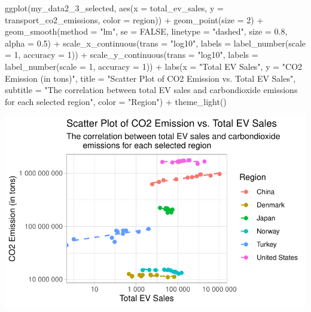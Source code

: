 \documentclass[
  11pt,
  a4paper,
  DIV=11,
  numbers=noendperiod]{scrartcl}
\newenvironment{Shaded}{\begin{snugshade}}{\end{snugshade}}
\newcommand{\AttributeTok}[1]{\textcolor[rgb]{0.40,0.45,0.13}{#1}}
\newcommand{\ConstantTok}[1]{\textcolor[rgb]{0.56,0.35,0.01}{#1}}
\newcommand{\DecValTok}[1]{\textcolor[rgb]{0.68,0.00,0.00}{#1}}
\newcommand{\FloatTok}[1]{\textcolor[rgb]{0.68,0.00,0.00}{#1}}
\newcommand{\FunctionTok}[1]{\textcolor[rgb]{0.28,0.35,0.67}{#1}}
\newcommand{\NormalTok}[1]{\textcolor[rgb]{0.00,0.23,0.31}{#1}}
\newcommand{\SpecialCharTok}[1]{\textcolor[rgb]{0.37,0.37,0.37}{#1}}
\newcommand{\StringTok}[1]{\textcolor[rgb]{0.13,0.47,0.30}{#1}}
\begin{document}
\begin{Shaded}
\begin{Highlighting}[]
\FunctionTok{ggplot}\NormalTok{(my\_data2\_3\_selected, }\FunctionTok{aes}\NormalTok{(}\AttributeTok{x =}\NormalTok{ total\_ev\_sales, }\AttributeTok{y =}\NormalTok{ transport\_co2\_emissions,}
                                \AttributeTok{color =}\NormalTok{ region)) }\SpecialCharTok{+}
  \FunctionTok{geom\_point}\NormalTok{(}\AttributeTok{size =} \DecValTok{2}\NormalTok{) }\SpecialCharTok{+}
  \FunctionTok{geom\_smooth}\NormalTok{(}\AttributeTok{method =} \StringTok{"lm"}\NormalTok{, }\AttributeTok{se =} \ConstantTok{FALSE}\NormalTok{, }\AttributeTok{linetype =} \StringTok{"dashed"}\NormalTok{, }\AttributeTok{size =} \FloatTok{0.8}\NormalTok{,}
              \AttributeTok{alpha =} \FloatTok{0.5}\NormalTok{) }\SpecialCharTok{+}
  \FunctionTok{scale\_x\_continuous}\NormalTok{(}\AttributeTok{trans =} \StringTok{"log10"}\NormalTok{,}
                     \AttributeTok{labels =} \FunctionTok{label\_number}\NormalTok{(}\AttributeTok{scale =} \DecValTok{1}\NormalTok{, }\AttributeTok{accuracy =} \DecValTok{1}\NormalTok{)) }\SpecialCharTok{+}
  \FunctionTok{scale\_y\_continuous}\NormalTok{(}\AttributeTok{trans =} \StringTok{"log10"}\NormalTok{,}
                     \AttributeTok{labels =} \FunctionTok{label\_number}\NormalTok{(}\AttributeTok{scale =} \DecValTok{1}\NormalTok{, }\AttributeTok{accuracy =} \DecValTok{1}\NormalTok{)) }\SpecialCharTok{+}
  \FunctionTok{labs}\NormalTok{(}\AttributeTok{x =} \StringTok{"Total EV Sales"}\NormalTok{,}
       \AttributeTok{y =} \StringTok{"CO2 Emission (in tons)"}\NormalTok{,}
       \AttributeTok{title =} \StringTok{"Scatter Plot of CO2 Emission vs. Total EV Sales"}\NormalTok{,}
       \AttributeTok{subtitle =} \StringTok{"The correlation between total EV sales and carbondioxide}
\StringTok{       emissions for each selected region"}\NormalTok{,}
       \AttributeTok{color =} \StringTok{"Region"}\NormalTok{) }\SpecialCharTok{+}
  \FunctionTok{theme\_light}\NormalTok{()}
\end{Highlighting}
\end{Shaded}

\includegraphics{analysis_files/figure-pdf/unnamed-chunk-16-1.pdf}
\end{document}
